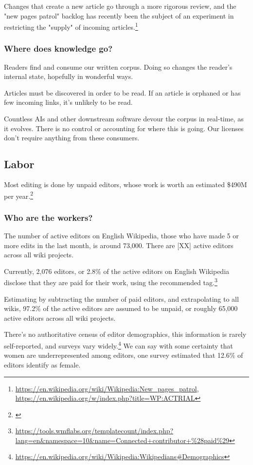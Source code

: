 Changes that create a new article go through a more rigorous review, and the "new pages patrol" backlog has recently been the subject of an experiment in restricting the "supply" of incoming articles.\footnote{\url{https://en.wikipedia.org/wiki/Wikipedia:New_pages_patrol}, \url{https://en.wikipedia.org/w/index.php?title=WP:ACTRIAL}}

\subsubsection{Where does knowledge go?}

Readers find and consume our written corpus.  Doing so changes the reader's internal state, hopefully in wonderful ways.

Articles must be discovered in order to be read.  If an article is orphaned or has few incoming links, it's unlikely to be read.

Countless AIs and other downstream software devour the corpus in real-time, as it evolves.  There is no control or accounting for where this is going.  Our licenses don't require anything from these consumers.

\subsection{Labor}

Most editing is done by unpaid editors, whose work is worth an estimated \$490M per year.\footnote{\citep{Lund}}

\subsubsection{Who are the workers?}

The number of active editors on English Wikipedia, those who have made 5 or more edits in the last month, is around 73,000.  There are [XX] active editors across all wiki projects.

Currently, 2,076 editors, or 2.8\% of the active editors on English Wikipedia  disclose that they are paid for their work, using the recommended tag.\footnote{\url{https://tools.wmflabs.org/templatecount/index.php?lang=en&namespace=10&name=Connected+contributor+\%28paid\%29}}

Estimating by subtracting the number of paid editors, and extrapolating to all wikis, 97.2\% of the active editors are assumed to be unpaid, or roughly 65,000 active editors across all wiki projects.

There's no authoritative census of editor demographics, this information is rarely self-reported, and surveys vary widely.\footnote{\url{https://en.wikipedia.org/wiki/Wikipedia:Wikipedians\#Demographics}}  We can say with some certainty that women are underrepresented among editors, one survey estimated that 12.6\% of editors identify as female.


